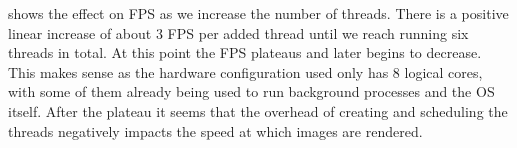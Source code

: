  shows the effect on \gls{FPS} as we increase the number of threads.
There is a positive linear increase of about 3 \gls{FPS} per added thread until we reach running six threads in total.
At this point the \gls{FPS} plateaus and later begins to decrease.
This makes sense as the hardware configuration used only has 8 logical cores, with some of them already being used to run background processes and the \gls{OS} itself.
After the plateau it seems that the overhead of creating and scheduling the threads negatively impacts the speed at which images are rendered.


